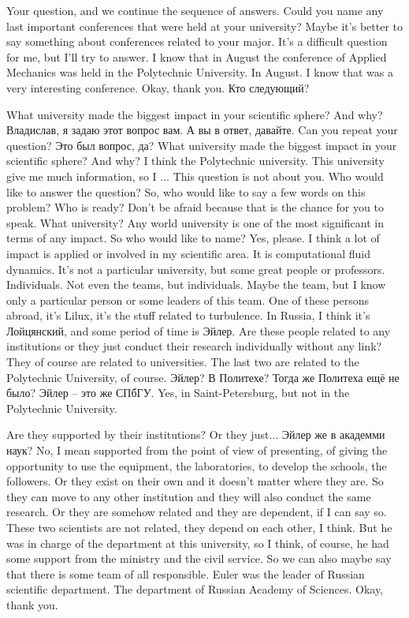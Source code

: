 \documentclass[main.tex]{subfiles}
\begin{document}
Your question, and we continue the sequence of answers.
Could you name any last important conferences that were held at your university?
Maybe it's better to say something about conferences related to your major.
It's a difficult question for me, but I'll try to answer.
I know that in August the conference of Applied Mechanics was held in the Polytechnic University.
In August.
I know that was a very interesting conference.
Okay, thank you.
Кто следующий?

What university made the biggest impact in your scientific sphere?
And why?
Владислав, я задаю этот вопрос вам.
А вы в ответ, давайте.
Can you repeat your question?
Это был вопрос, да?
What university made the biggest impact in your scientific sphere?
And why?
I think the Polytechnic university.
This university give me much information, so I ...
This question is not about you.
Who would like to answer the question?
So, who would like to say a few words on this problem?
Who is ready?
Don't be afraid because that is the chance for you to speak.
What university?
Any world university is one of the most significant in terms of any impact.
So who would like to name?
Yes, please.
I think a lot of impact is applied or involved in my scientific area.
It is computational fluid dynamics.
It's not a particular university, but some great people or professors.
Individuals.
Not even the teams, but individuals.
Maybe the team, but I know only a particular person or some leaders of this team.
One of these persons abroad, it's Lilux, it's the stuff related to turbulence.
In Russia, I think it's Лойцянский, and some period of time is Эйлер.
Are these people related to any institutions or they just conduct their research individually without any link?
They of course are related to universities.
The last two are related to the Polytechnic University, of course.
Эйлер?
В Политехе?
Тогда же Политеха ещё не было?
Эйлер -- это же СПбГУ.
Yes, in Saint-Petersburg, but not in the Polytechnic University.

Are they supported by their institutions?
Or they just...
Эйлер же в академми наук?
No, I mean supported from the point of view of presenting, of giving the opportunity to use the equipment, the laboratories, to develop the schools, the followers.
Or they exist on their own and it doesn't matter where they are.
So they can move to any other institution and they will also conduct the same research.
Or they are somehow related and they are dependent, if I can say so.
These two scientists are not related, they depend on each other, I think.
But he was in charge of the department at this university, so I think, of course, he had some support from the ministry and the civil service.
So we can also maybe say that there is some team of all responsible.
Euler was the leader of Russian scientific department.
The department of Russian Academy of Sciences.
Okay, thank you.
\end{document}
